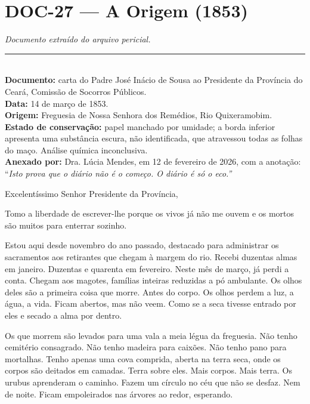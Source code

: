 \section*{\textbf{DOC-27} --- A Origem (1853)}

\noindent \textit{Documento extraído do arquivo pericial.}

\vspace{0.5em}\noindent\rule{\textwidth}{0.5pt}\vspace{0.5em}

\\[-0.2em]

\noindent\textbf{Documento:} carta do Padre José Inácio de Sousa ao Presidente da Província do Ceará, Comissão de Socorros Públicos.\\
\noindent\textbf{Data:} 14 de março de 1853.\\
\noindent\textbf{Origem:} Freguesia de Nossa Senhora dos Remédios, Rio Quixeramobim.\\
\noindent\textbf{Estado de conservação:} papel manchado por umidade; a borda inferior apresenta uma substância escura, não identificada, que atravessou todas as folhas do maço. Análise química inconclusiva.\\
\noindent\textbf{Anexado por:} Dra. Lúcia Mendes, em 12 de fevereiro de 2026, com a anotação: \textquotedblleft{\textit{Isto prova que o diário não é o começo. O diário é só o eco.\textquotedblright{}}}

\noindent Excelentíssimo Senhor Presidente da Província,

\noindent Tomo a liberdade de escrever-lhe porque os vivos já não me ouvem e os mortos são muitos para enterrar sozinho.

\noindent Estou aqui desde novembro do ano passado, destacado para administrar os sacramentos aos retirantes que chegam à margem do rio. Recebi duzentas almas em janeiro. Duzentas e quarenta em fevereiro. Neste mês de março, já perdi a conta. Chegam aos magotes, famílias inteiras reduzidas a pó ambulante. Os olhos deles são a primeira coisa que morre. Antes do corpo. Os olhos perdem a luz, a água, a vida. Ficam abertos, mas não veem. Como se a seca tivesse entrado por eles e secado a alma por dentro.

\noindent Os que morrem são levados para uma vala a meia légua da freguesia. Não tenho cemitério consagrado. Não tenho madeira para caixões. Não tenho pano para mortalhas. Tenho apenas uma cova comprida, aberta na terra seca, onde os corpos são deitados em camadas. Terra sobre eles. Mais corpos. Mais terra. Os urubus aprenderam o caminho. Fazem um círculo no céu que não se desfaz. Nem de noite. Ficam empoleirados nas árvores ao redor, esperando.

